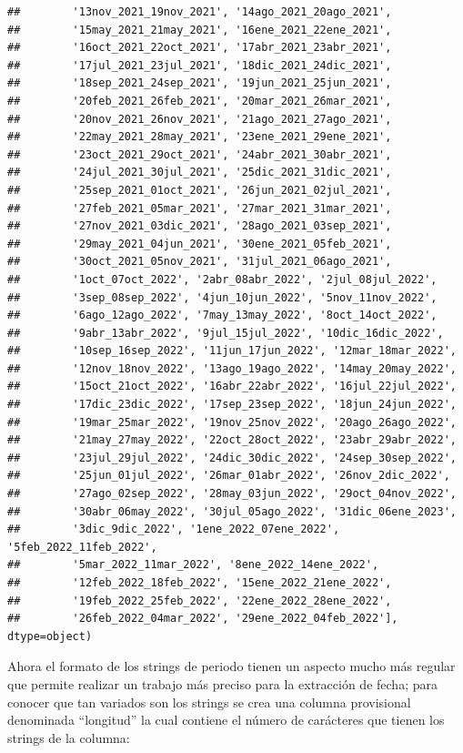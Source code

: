 \documentclass[
]{book}
\begin{document}
\begin{verbatim}
##        '13nov_2021_19nov_2021', '14ago_2021_20ago_2021',
##        '15may_2021_21may_2021', '16ene_2021_22ene_2021',
##        '16oct_2021_22oct_2021', '17abr_2021_23abr_2021',
##        '17jul_2021_23jul_2021', '18dic_2021_24dic_2021',
##        '18sep_2021_24sep_2021', '19jun_2021_25jun_2021',
##        '20feb_2021_26feb_2021', '20mar_2021_26mar_2021',
##        '20nov_2021_26nov_2021', '21ago_2021_27ago_2021',
##        '22may_2021_28may_2021', '23ene_2021_29ene_2021',
##        '23oct_2021_29oct_2021', '24abr_2021_30abr_2021',
##        '24jul_2021_30jul_2021', '25dic_2021_31dic_2021',
##        '25sep_2021_01oct_2021', '26jun_2021_02jul_2021',
##        '27feb_2021_05mar_2021', '27mar_2021_31mar_2021',
##        '27nov_2021_03dic_2021', '28ago_2021_03sep_2021',
##        '29may_2021_04jun_2021', '30ene_2021_05feb_2021',
##        '30oct_2021_05nov_2021', '31jul_2021_06ago_2021',
##        '1oct_07oct_2022', '2abr_08abr_2022', '2jul_08jul_2022',
##        '3sep_08sep_2022', '4jun_10jun_2022', '5nov_11nov_2022',
##        '6ago_12ago_2022', '7may_13may_2022', '8oct_14oct_2022',
##        '9abr_13abr_2022', '9jul_15jul_2022', '10dic_16dic_2022',
##        '10sep_16sep_2022', '11jun_17jun_2022', '12mar_18mar_2022',
##        '12nov_18nov_2022', '13ago_19ago_2022', '14may_20may_2022',
##        '15oct_21oct_2022', '16abr_22abr_2022', '16jul_22jul_2022',
##        '17dic_23dic_2022', '17sep_23sep_2022', '18jun_24jun_2022',
##        '19mar_25mar_2022', '19nov_25nov_2022', '20ago_26ago_2022',
##        '21may_27may_2022', '22oct_28oct_2022', '23abr_29abr_2022',
##        '23jul_29jul_2022', '24dic_30dic_2022', '24sep_30sep_2022',
##        '25jun_01jul_2022', '26mar_01abr_2022', '26nov_2dic_2022',
##        '27ago_02sep_2022', '28may_03jun_2022', '29oct_04nov_2022',
##        '30abr_06may_2022', '30jul_05ago_2022', '31dic_06ene_2023',
##        '3dic_9dic_2022', '1ene_2022_07ene_2022', '5feb_2022_11feb_2022',
##        '5mar_2022_11mar_2022', '8ene_2022_14ene_2022',
##        '12feb_2022_18feb_2022', '15ene_2022_21ene_2022',
##        '19feb_2022_25feb_2022', '22ene_2022_28ene_2022',
##        '26feb_2022_04mar_2022', '29ene_2022_04feb_2022'], dtype=object)
\end{verbatim}

Ahora el formato de los strings de periodo tienen un aspecto mucho más regular que permite realizar un trabajo más preciso para la extracción de fecha; para conocer que tan variados son los strings se crea una columna provisional denominada ``longitud'' la cual contiene el número de carácteres que tienen los strings de la columna:
\end{document}
